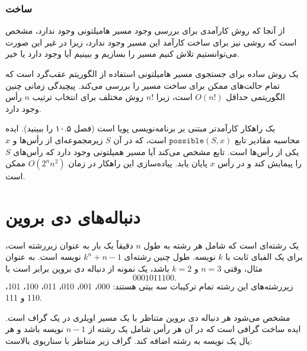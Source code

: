 \subsubsection{ساخت}

از آنجا که روش کارآمدی برای بررسی وجود مسیر هامیلتونی
وجود ندارد، مشخص است که روشی نیز برای ساخت کارآمد
این مسیر وجود ندارد، زیرا در غیر این صورت
می‌توانستیم تلاش کنیم مسیر را بسازیم و ببینیم
آیا وجود دارد یا خیر.

یک روش ساده برای جستجوی مسیر هامیلتونی
استفاده از الگوریتم عقب‌گرد است که تمام
حالت‌های ممکن برای ساخت مسیر را بررسی می‌کند.
پیچیدگی زمانی چنین الگوریتمی حداقل $O(n!)$ است،
زیرا $n!$ روش مختلف برای انتخاب ترتیب $n$ رأس وجود دارد.

یک راهکار کارآمدتر مبتنی بر برنامه‌نویسی پویا است
(فصل ۱۰.۵ را ببینید).
ایده محاسبه مقادیر
تابع $\texttt{possible}(S,x)$ است،
که در آن $S$ زیرمجموعه‌ای از رأس‌ها و $x$
یکی از رأس‌ها است.
تابع مشخص می‌کند آیا مسیر همیلتونی وجود دارد
که رأس‌های $S$ را پیمایش کند و در رأس $x$ پایان یابد.
پیاده‌سازی این راهکار در زمان $O(2^n n^2)$ ممکن است.

\section{دنباله‌های دی بروین}


یک 
رشته‌ای است که شامل
هر رشته به طول $n$
دقیقاً یک بار به عنوان زیررشته است، برای یک
الفبای ثابت با $k$ نویسه.
طول چنین رشته‌ای
$k^n+n-1$ نویسه است.
به عنوان مثال، وقتی $n=3$ و $k=2$ باشد،
یک نمونه از دنباله دی بروین برابر است با
\[0001011100.\]
زیررشته‌های این رشته تمام
ترکیبات سه بیتی هستند:
000، 001، 010، 011، 100، 101، 110 و 111.

مشخص می‌شود هر دنباله دی بروین
متناظر با یک مسیر اویلری در یک گراف است.
ایده ساخت گرافی است که در آن
هر رأس شامل یک رشته از $n-1$ نویسه باشد
و هر یال یک نویسه به رشته اضافه کند.
گراف زیر متناظر با سناریوی بالاست:

\begin{center}
\end{center}

